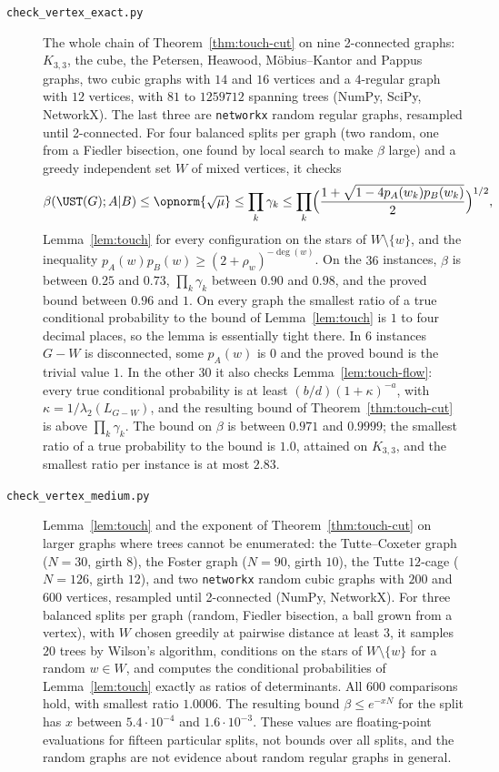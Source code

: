 \begin{description}
\item[\texttt{check\_vertex\_exact.py}] The whole chain of Theorem~\ref{thm:touch-cut} on nine 2-connected graphs: $K_{3,3}$, the cube, the Petersen, Heawood, M\"obius--Kantor and Pappus graphs, two cubic graphs with $14$ and $16$ vertices and a $4$-regular graph with $12$ vertices, with $81$ to $1259712$ spanning trees (NumPy, SciPy, NetworkX). The last three are \texttt{networkx} random regular graphs, resampled until 2-connected. For four balanced splits per graph (two random, one from a Fiedler bisection, one found by local search to make $\beta$ large) and a greedy independent set $W$ of mixed vertices, it checks
\[
  \beta(\UST(G);A|B)\le\opnorm{\sqrt\mu}\le\prod_k\gamma_k\le\prod_k\Bigl(\frac{1+\sqrt{1-4p_A(w_k)p_B(w_k)}}2\Bigr)^{1/2},
\]
Lemma~\ref{lem:touch} for every configuration on the stars of $W\setminus\{w\}$, and the inequality $p_A(w)p_B(w)\ge(2+\rho_w)^{-\deg(w)}$. On the $36$ instances, $\beta$ is between $0.25$ and $0.73$, $\prod_k\gamma_k$ between $0.90$ and $0.98$, and the proved bound between $0.96$ and $1$. On every graph the smallest ratio of a true conditional probability to the bound of Lemma~\ref{lem:touch} is $1$ to four decimal places, so the lemma is essentially tight there. In $6$ instances $G-W$ is disconnected, some $p_A(w)$ is $0$ and the proved bound is the trivial value $1$. In the other $30$ it also checks Lemma~\ref{lem:touch-flow}: every true conditional probability is at least $(b/d)(1+\kappa)^{-a}$, with $\kappa=1/\lambda_2(L_{G-W})$, and the resulting bound of Theorem~\ref{thm:touch-cut} is above $\prod_k\gamma_k$. The bound on $\beta$ is between $0.971$ and $0.9999$; the smallest ratio of a true probability to the bound is $1.0$, attained on $K_{3,3}$, and the smallest ratio per instance is at most $2.83$.

\item[\texttt{check\_vertex\_medium.py}] Lemma~\ref{lem:touch} and the exponent of Theorem~\ref{thm:touch-cut} on larger graphs where trees cannot be enumerated: the Tutte--Coxeter graph ($N=30$, girth $8$), the Foster graph ($N=90$, girth $10$), the Tutte $12$-cage ($N=126$, girth $12$), and two \texttt{networkx} random cubic graphs with $200$ and $600$ vertices, resampled until 2-connected (NumPy, NetworkX). For three balanced splits per graph (random, Fiedler bisection, a ball grown from a vertex), with $W$ chosen greedily at pairwise distance at least $3$, it samples $20$ trees by Wilson's algorithm, conditions on the stars of $W\setminus\{w\}$ for a random $w\in W$, and computes the conditional probabilities of Lemma~\ref{lem:touch} exactly as ratios of determinants. All $600$ comparisons hold, with smallest ratio $1.0006$. The resulting bound $\beta\le e^{-xN}$ for the split has $x$ between $5.4\cdot10^{-4}$ and $1.6\cdot10^{-3}$. These values are floating-point evaluations for fifteen particular splits, not bounds over all splits, and the random graphs are not evidence about random regular graphs in general.


\end{description}
